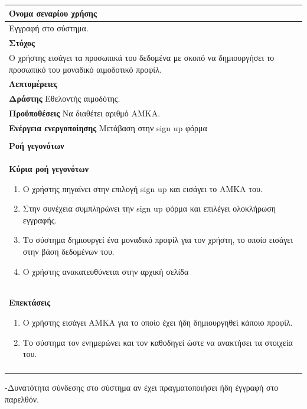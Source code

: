 \begin{center}
    \begin{tabular}{|p{\dimexpr \linewidth-2\tabcolsep}|}
    \hline
    \rowcolor{grayy}
    \textbf{Όνομα σεναρίου χρήσης}
    \\ \hline    
    Εγγραφή στο σύστημα.
     \\ \hline
    \rowcolor{grayy}
    \textbf{Στόχος}
    \\ \hline
   Ο χρήστης εισάγει τα προσωπικά του δεδομένα με σκοπό να δημιουργήσει το προσωπικό του  μοναδικό αιμοδοτικό προφίλ.
    \\ \hline
    \rowcolor{grayy}
    \textbf{Λεπτομέρειες}
    \\ \hline
	\textbf{Δράστης} Εθελοντής αιμοδότης.
	\\*
	\textbf{Προϋποθέσεις} Να διαθέτει αριθμό ΑΜΚΑ.
	\\*
	\textbf{Ενέργεια ενεργοποίησης} Μετάβαση στην sign up φόρμα
	\\ \hline
    \\ \hline
	\rowcolor{grayy}    
    \textbf{Ροή γεγονότων}
    \\* 
	\textbf{Κύρια ροή γεγονότων}
	\begin{enumerate}
	\item	Ο χρήστης πηγαίνει στην επιλογή sign up και εισάγει το ΑΜΚΑ του.
	\item Στην συνέχεια συμπληρώνει την sign up φόρμα και επιλέγει ολοκλήρωση εγγραφής.
	\item Το σύστημα δημιουργεί ένα μοναδικό προφίλ για τον χρήστη, το οποίο εισάγει στην βάση δεδομένων του.
	\item Ο χρήστης ανακατευθύνεται στην αρχική σελίδα 
	\end{enumerate}
	\\*
	\textbf{Επεκτάσεις} 
	\begin{enumerate}
	\item	Ο χρήστης εισάγει ΑΜΚΑ για το οποίο έχει ήδη δημιουργηθεί κάποιο προφίλ.
	\item Το σύστημα τον ενημερώνει και τον καθοδηγεί ώστε να ανακτήσει τα στοιχεία του.
	\end{enumerate}
	\\*
	\\ \hline
    \end{tabular}
	\end{center}

-Δυνατότητα σύνδεσης στο σύστημα αν έχει πραγματοποιήσει ήδη έγγραφή στο παρελθόν.
	
